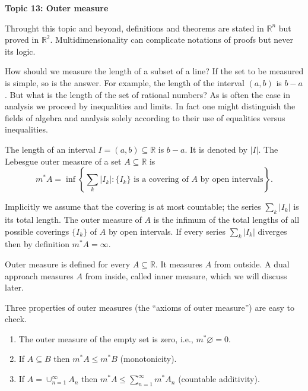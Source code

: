 \documentclass[11pt]{article}
\begin{document}
\begin{center}
  \textbf{Topic 13: Outer measure}
\end{center}

Throught this topic and beyond, definitions and theorems are stated in $\mathbb{R}^n$ but proved in $\mathbb{R}^2$.  Multidimensionality can complicate notations of proofs but never its logic.

How should we measure the length of a subset of a line?  If the set to be measured is simple, so is the answer.  For example, the length of the interval $(a,b)$ is $b-a$.
But what is the length of the set of rational numbers?  As is often the case in analysis we proceed by inequalities and limits.
In fact one might distinguish the fields of algebra and analysis solely according to their use of equalities versus inequalities.

\begin{defn}
  The \textsf{length} of an interval $I = (a,b) \subseteq \mathbb{R}$ is $b-a$.
  It is denoted by $|I|$.  The \textsf{Lebesgue outer measure} of a set $A \subseteq \mathbb{R}$ is
  \[
    m^* A = \inf \left\{ \sum_k |I_k| : \text{$\{ I_k \}$ is a covering of $A$ by open intervals} \right\}.
  \]
\end{defn}
Implicitly we assume that the covering is at most countable; the series $\sum_k |I_k|$ is its total length.  The outer measure of $A$ is the infimum of the total lengths of all possible coverings $\{I_k\}$ of $A$ by open intervals.  If every series $\sum_k |I_k|$ diverges then by definition $m^*A = \infty$.

Outer measure is defined for every $A \subseteq \mathbb{R}$.  It measures $A$ from outside.  A dual approach measures $A$ from inside, called \textsf{inner measure}, which we will discuss later.

Three properties of outer measures (the ``axioms of outer measure'') are easy to check.

\begin{thm}
  \begin{enumerate}[(1)]
    \item The outer measure of the empty set is zero, i.e., $m^* \varnothing = 0$.

    \item If $A \subseteq B$ then $m^*A \leqslant m^*B$ (monotonicity).

    \item If $A = \cup_{n=1}^\infty A_n$ then $m^*A \leqslant \sum_{n=1}^\infty m^*A_n$ (countable additivity).
  \end{enumerate} 
\end{thm}
\end{document}
